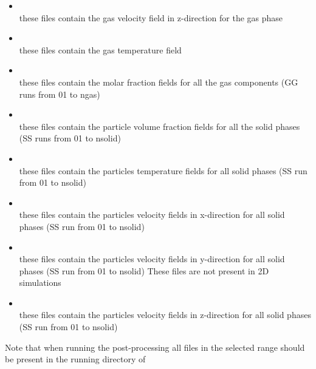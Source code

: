 \begin{itemize}
\item {} \\
      these files contain the gas velocity field in z-direction
for the gas phase

\item {} \\
      these files contain the gas temperature field 

\item {} \\
      these files contain the molar fraction fields for all the gas 
      components (GG runs from 01 to ngas) 

\item {} \\
      these files contain the particle volume fraction fields for all the 
      solid phases (SS runs from 01 to nsolid) 

\item {} \\
      these files contain the particles temperature fields
      for all solid phases (SS run from 01 to nsolid)

\item {} \\
      these files contain the particles velocity fields in x-direction
      for all solid phases (SS run from 01 to nsolid)

\item {} \\
      these files contain the particles velocity fields in y-direction
      for all solid phases (SS run from 01 to nsolid)
      These files are not present in 2D simulations

\item {} \\
      these files contain the particles velocity fields in z-direction
      for all solid phases (SS run from 01 to nsolid)


\end{itemize}

Note that when running the post-processing all 
 files in the selected range should 
be present in the running directory of 

%
%
%
%
